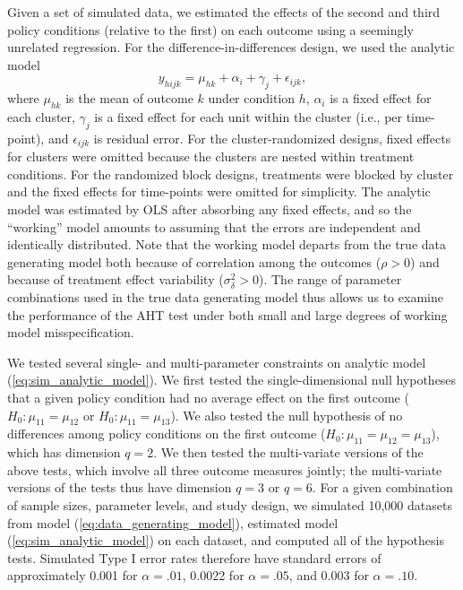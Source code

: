\documentclass[12pt]{article}\usepackage[]{graphicx}\usepackage[]{color}
\begin{document}
Given a set of simulated data, we estimated the effects of the second and third policy conditions (relative to the first) on each outcome using a seemingly unrelated regression. 
For the difference-in-differences design, we used the analytic model
\begin{equation}
\label{eq:sim_analytic_model}
y_{hijk} = \mu_{hk} + \alpha_i + \gamma_j + \epsilon_{ijk},
\end{equation}
where $\mu_{hk}$ is the mean of outcome $k$ under condition $h$, $\alpha_i$ is a fixed effect for each cluster, $\gamma_j$ is a fixed effect for each unit within the cluster (i.e., per time-point), and $\epsilon_{ijk}$ is residual error. 
For the cluster-randomized designs, fixed effects for clusters were omitted because the clusters are nested within treatment conditions. 
For the randomized block designs, treatments were blocked by cluster and the fixed effects for time-points were omitted for simplicity.
The analytic model was estimated by OLS after absorbing any fixed effects, and so the ``working'' model amounts to assuming that the errors are independent and identically distributed. 
Note that the working model departs from the true data generating model both because of correlation among the outcomes ($\rho > 0$) and because of treatment effect variability ($\sigma_\delta^2 > 0$). 
The range of parameter combinations used in the true data generating model thus allows us to examine the performance of the AHT test under both small and large degrees of working model misspecification. 

We tested several single- and multi-parameter constraints on analytic model (\ref{eq:sim_analytic_model}). 
We first tested the single-dimensional null hypotheses that a given policy condition had no average effect on the first outcome ($H_0: \mu_{11} = \mu_{12}$ or $H_0: \mu_{11} = \mu_{13}$). 
We also tested the null hypothesis of no differences among policy conditions on the first outcome ($H_0: \mu_{11} = \mu_{12} = \mu_{13}$), which has dimension $q = 2$. 
We then tested the multi-variate versions of the above tests, which involve all three outcome measures jointly; the multi-variate versions of the tests thus have dimension $q = 3$ or $q = 6$. 
For a given combination of sample sizes, parameter levels, and study design, we simulated 10,000 datasets from model (\ref{eq:data_generating_model}), estimated model (\ref{eq:sim_analytic_model}) on each dataset, and computed all of the hypothesis tests. 
Simulated Type I error rates therefore have standard errors of approximately 0.001 for $\alpha = .01$, 0.0022 for $\alpha = .05$, and 0.003 for $\alpha = .10$. 
\end{document}
